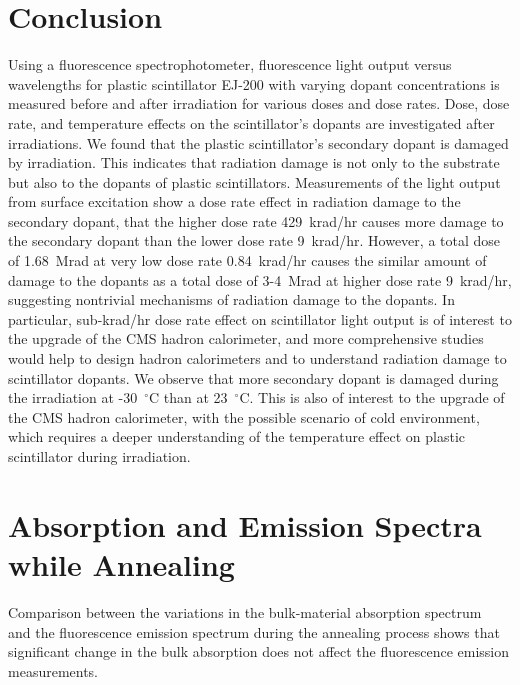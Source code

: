 \documentclass[preprint]{elsarticle}
\begin{document}
\section{Conclusion}
Using a fluorescence spectrophotometer, fluorescence light output versus wavelengths for plastic scintillator EJ-200 with varying 
dopant concentrations is measured before and after irradiation for various doses and dose rates. 
Dose, dose rate, and temperature effects on the scintillator's dopants are investigated after irradiations.
We found that the plastic scintillator's secondary dopant is damaged by irradiation. 
This indicates that radiation damage is not only to the substrate but also to the dopants of plastic scintillators. 
Measurements of the light output from surface excitation show a dose rate effect in radiation damage to the secondary dopant, 
that the higher dose rate 429~krad/hr causes more damage to the secondary dopant than the lower dose rate 9~krad/hr. 
However, a total dose of 1.68~Mrad at very low dose rate 0.84~krad/hr causes the similar amount of damage to the dopants as 
a total dose of 3-4~Mrad at higher dose rate 9~krad/hr, suggesting nontrivial mechanisms of radiation damage to the dopants. 
In particular, sub-krad/hr dose rate effect on scintillator light output is of interest to the upgrade of the CMS hadron calorimeter, 
and more comprehensive studies would help to design hadron calorimeters and to understand radiation damage to scintillator dopants.
We observe that more secondary dopant is damaged during the irradiation at -30~$^\circ$C than at 23~$^\circ$C. 
This is also of interest to the upgrade of the CMS hadron calorimeter, with the possible scenario of cold environment, 
which requires a deeper understanding of the temperature effect on plastic scintillator during irradiation. 


\appendix

\section{Absorption and Emission Spectra while Annealing}

Comparison between the variations in the bulk-material absorption spectrum~\cite{kak} and the fluorescence emission spectrum 
during the annealing process shows that significant change in the bulk absorption does not affect the fluorescence emission measurements. 
\end{document}
